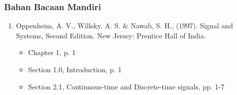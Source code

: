 \documentclass[pdflatex,compress,mathserif]{beamer}
\begin{document}
\begin{frame}
	\frametitle{Bahan Bacaan Mandiri}
	\begin{enumerate}
		\item Oppenheim, A. V., Willsky, A. S. \& Nawab, S. H., (1997). Signal and Systems, Second Edition. New Jersey: Prentice Hall of India.
		\begin{itemize}
			\item Chapter 1, p. 1
			\item Section 1.0, Introduction, p. 1
			\item Section 2.1, Continuous-time and Discrete-time signals, pp. 1-7
		\end{itemize}
	\end{enumerate}
\end{frame}
\end{document}
